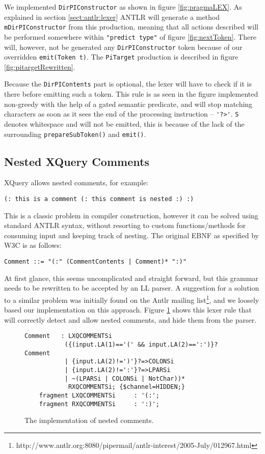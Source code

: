We implemented \verb!DirPIConstructor! as shown in figure \ref{fig:pragmaLEX}. As explained in section \ref{sect:antlr:lexer} ANTLR will generate a method \verb!mDirPIConstructor! from this production, meaning that all actions described will be performed somewhere within \verb!"predict type"! of figure \ref{fig:nextToken}. There will, however, not be generated any \verb!DirPIConstructor! token because of our overridden \verb!emit(Token t)!. The \verb!PiTarget! production is described in figure \ref{fig:pitargetRewritten}.

Because the \verb!DirPIContents! part is optional, the lexer will have to check if it is there before emitting such a token. This rule is as seen in the figure implemented non-greedy with the help of a gated semantic predicate, and will stop matching characters as soon as it sees the end of the processing instruction -- \verb!'?>'!. \verb!S! denotes whitespace and will not be emitted, this is because of the lack of the surrounding \verb!prepareSubToken()! and \verb!emit()!.

\subsection{Nested XQuery Comments}
XQuery allows nested comments, for example:
\begin{Verbatim}
(: this is a comment (: this comment is nested :) :)
\end{Verbatim}
This is a classic problem in compiler construction, however it can be solved using standard ANTLR syntax, without resorting to custom functions/methods for consuming input and keeping track of nesting. The original EBNF as specified by W3C is as follows:
\begin{Verbatim}
Comment ::= "(:" (CommentContents | Comment)* ":)"
\end{Verbatim}
At first glance, this seems uncomplicated and straight forward, but this
grammar needs to be rewritten to be accepted by an LL parser. A suggestion for a solution to a similar problem was initially found on the Antlr mailing list\footnote{http://www.antlr.org:8080/pipermail/antlr-interest/2005-July/012967.html}, and we loosely based our implementation on this approach. Figure \ref{fig:nestedComment} shows this lexer rule that will correctly detect and allow nested comments, and hide them from the parser.
\begin{figure}[h!]
\begin{Verbatim}
Comment   : LXQCOMMENTSi 
           ({(input.LA(1)=='(' && input.LA(2)==':')}?Comment 
           | {input.LA(2)!=')'}?=>COLONSi
           | {input.LA(2)!=':'}?=>LPARSi
           | ~(LPARSi | COLONSi | NotChar))*
            RXQCOMMENTSi; {$channel=HIDDEN;}
    fragment LXQCOMMENTSi     : '(:';
    fragment RXQCOMMENTSi     : ':)';
\end{Verbatim}
\label{fig:nestedComment}
\caption[The implementation of nested comments]{The implementation of nested comments.}
\end{figure}


